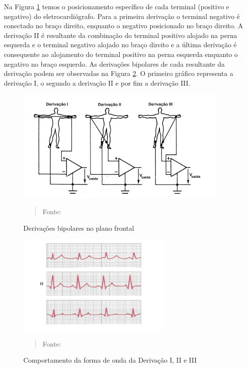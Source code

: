 \documentclass[12pt, a4paper]{article}
\begin{document}
Na Figura \ref{fig:d1} temos o posicionamento específico de cada terminal (positivo e negativo) do eletrocardiógrafo. Para a primeira derivação o terminal negativo é conectado no braço direito, enquanto o negativo posicionado no braço direito. A derivação II é resultante da combinação do terminal positivo alojado na perna esquerda e o terminal negativo alojado no braço direito e a última derivação é consequente ao alojamento do terminal positivo na perna esquerda enquanto o negativo no braço esquerdo. As derivações bipolares de cada resultante da derivação podem ser observadas na  Figura \ref{fig:d2}. O primeiro gráfico representa a derivação I, o segundo a derivação II e por fim a derivação III.

\begin{figure}[!htb]
\begin{center}
			\caption{Derivações bipolares no plano frontal}
			\includegraphics[width=.5\textwidth]{Figuras/d1.PNG}
            \vspace*{\fill} 
            \begin{quote} 
            \centering 
            Fonte: \cite{ebah}
            \end{quote}
            \vspace*{\fill}
			\label{fig:d1}
\end{center}
\end{figure}




\begin{figure}[H]
\begin{center}
			\caption{Comportamento da forma de onda da Derivação I, II e III}
			\includegraphics[width=.5\textwidth]{Figuras/d2.PNG}
            \vspace*{\fill} 
            \begin{quote} 
            \centering 
            Fonte: \cite{guyton}
            \end{quote}
            \vspace*{\fill}
			\label{fig:d2}
\end{center}
\end{figure}
\end{document}
